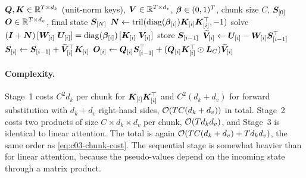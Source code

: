 \begin{algorithm}[t]
\caption{Delta rule, chunkwise form via the WY representation / UT transform}\label{alg:c03-delta-chunk}
\begin{algorithmic}[1]
\Require $\bm{Q},\bm{K}\in\mathbb{R}^{T\times d_k}$ (unit-norm keys), $\bm{V}\in\mathbb{R}^{T\times d_v}$, $\bm{\beta}\in(0,1)^T$, chunk size $C$, $\bm{S}_{[0]}$
\Ensure $\bm{O}\in\mathbb{R}^{T\times d_v}$, final state $\bm{S}_{[N]}$
  \State $\bm{N}\gets\mathrm{tril}(\operatorname{diag}(\bm{\beta}_{[i]})\bm{K}_{[i]}\bm{K}_{[i]}^{\top},-1)$ 
  \State solve $(\mI+\bm{N})\,[\mW_{[i]}\ \mU_{[i]}]=\diag(\vbeta_{[i]})\,[\mK_{[i]}\ \mV_{[i]}]$ 
\EndFor
{}
  \State store $\bm{S}_{[i-1]}$
  \State $\widetilde{\bm{V}}_{[i]}\gets\bm{U}_{[i]}-\bm{W}_{[i]}\bm{S}_{[i-1]}^{\top}$ 
  \State $\bm{S}_{[i]}\gets\bm{S}_{[i-1]}+\widetilde{\bm{V}}_{[i]}^{\top}\bm{K}_{[i]}$
\EndFor
{}
  \State $\bm{O}_{[i]}\gets\bm{Q}_{[i]}\bm{S}_{[i-1]}^{\top}+(\bm{Q}_{[i]}\bm{K}_{[i]}^{\top}\odot\bm{L}_C)\widetilde{\bm{V}}_{[i]}$
\EndFor
\end{algorithmic}
\end{algorithm}

\paragraph{Complexity.}
Stage~1 costs $C^2d_k$ per chunk for $\bm{K}_{[i]}\bm{K}_{[i]}^{\top}$ and $C^2(d_k+d_v)$ for forward
substitution with $d_k+d_v$ right-hand sides, $\mathcal{O}(TC(d_k+d_v))$ in total. Stage~2 costs two
products of size $C\times d_k\times d_v$ per chunk, $\mathcal{O}(Td_kd_v)$, and Stage~3 is identical to
linear attention. The total is again $\mathcal{O}(TC(d_k+d_v)+Td_kd_v)$, the same order as
\cref{eq:c03-chunk-cost}. The sequential stage is somewhat heavier than for linear attention,
because the pseudo-values depend on the incoming state through a matrix product.

